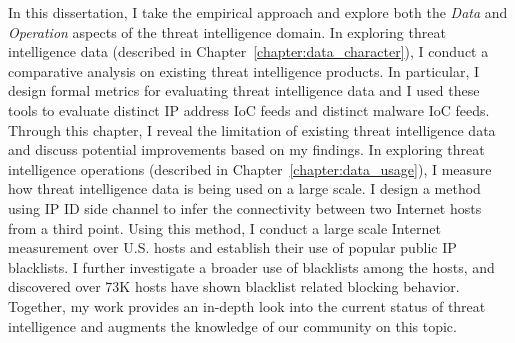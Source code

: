 In this dissertation, I take the empirical approach and explore both the 
\textit{Data} and \textit{Operation} aspects of the threat intelligence
domain. In exploring threat intelligence data (described in
Chapter~\ref{chapter:data_character}), I conduct a comparative analysis on
existing threat intelligence products. In particular, I design formal 
metrics for evaluating threat intelligence data and I used these tools to 
evaluate {\numipfeeds} distinct IP address IoC feeds and {\numhashfeeds}
distinct malware IoC feeds. Through this chapter, I reveal the limitation of
existing threat intelligence data and discuss potential improvements 
based on my findings. In exploring threat intelligence operations 
(described in Chapter~\ref{chapter:data_usage}),
I measure how threat intelligence data is being used on a large scale. 
I design a method using IP ID side channel to infer the connectivity 
between two Internet hosts from a third point. Using this 
method, I conduct a large scale Internet measurement over {} 
U.S. hosts and establish their use of {\blacklistnum} popular public IP
blacklists. I further investigate a broader use of blacklists among the 
hosts, and discovered over 73K hosts have shown blacklist related blocking 
behavior. Together, my work provides an in-depth look into the current
status of threat intelligence and augments the knowledge of our community
on this topic.

